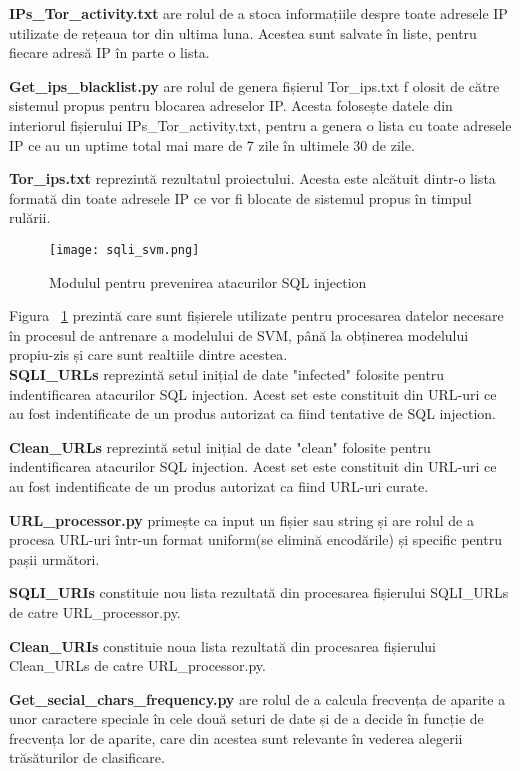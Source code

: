 \textbf{IPs\_Tor\_activity.txt}  are rolul de a stoca informațiile despre toate adresele IP utilizate de rețeaua tor din ultima luna. Acestea sunt salvate în liste, pentru fiecare adresă IP în parte o lista.  

\textbf{Get\_ips\_blacklist.py} are rolul de genera  fișierul  Tor\_ips.txt f olosit de către sistemul propus pentru blocarea adreselor IP. Acesta folosește datele din interiorul fișierului  IPs\_Tor\_activity.txt,  pentru a genera o lista cu toate adresele IP ce au un uptime total mai mare de 7 zile în ultimele 30 de zile. 

\textbf{Tor\_ips.txt}  reprezintă rezultatul proiectului. Acesta este alcătuit dintr-o lista formată din toate adresele IP ce vor fi blocate de sistemul propus în timpul rulării. 

\newpage

\begin{figure}[h]
	\centering
	\texttt{[image: sqli\_svm.png]}
	\caption{Modulul pentru prevenirea atacurilor SQL injection}
	\label{fig:sqli_svm}
\end{figure}
Figura ~\ref{fig:sqli_svm}  prezintă care sunt fișierele utilizate pentru procesarea datelor necesare în procesul de antrenare a modelului de SVM, până la obținerea modelului propiu-zis și care sunt realtiile dintre acestea. \\

\textbf{SQLI\_URLs}  reprezintă setul inițial de date "infected" folosite pentru indentificarea atacurilor SQL injection. Acest set este constituit din URL-uri ce au fost indentificate de un produs autorizat ca fiind tentative de SQL injection. 

\textbf{Clean\_URLs}  reprezintă setul inițial de date "clean" folosite pentru indentificarea atacurilor SQL injection. Acest set este constituit din URL-uri ce au fost indentificate de un produs autorizat ca fiind URL-uri curate. 

\textbf{URL\_processor.py}  primește ca input un fișier sau string și are rolul de a procesa URL-uri într-un format uniform(se elimină encodările) și specific pentru pașii următori. 

\textbf{SQLI\_URIs}  constituie nou lista rezultată din procesarea fișierului SQLI\_URLs de catre URL\_processor.py.

\textbf{Clean\_URIs}  constituie noua lista rezultată din procesarea fișierului Clean\_URLs de catre URL\_processor.py.

\textbf{Get\_secial\_chars\_frequency.py} are rolul de  a calcula frecvența de aparite a unor caractere speciale în cele două seturi de date și de a decide în funcție de frecvența lor de aparite, care din acestea sunt relevante în vederea alegerii trăsăturilor de clasificare. 

